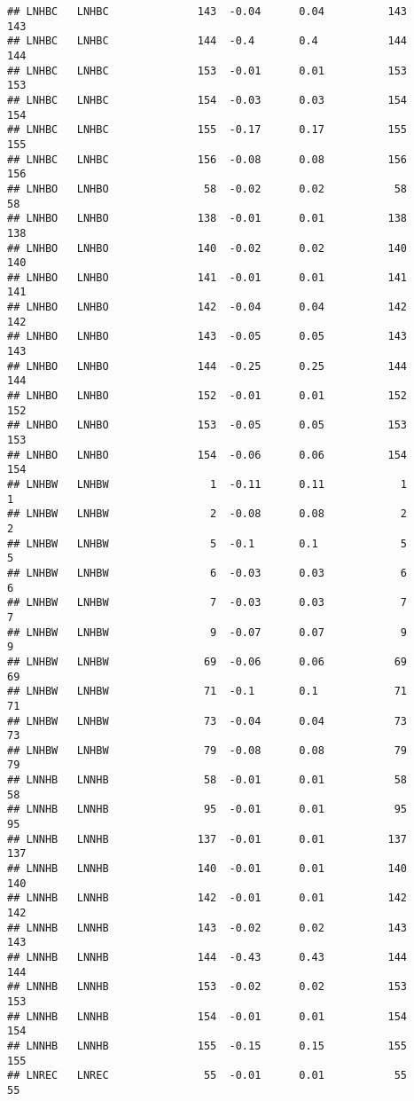 \documentclass[
]{article}
\begin{document}
\begin{verbatim}
## LNHBC   LNHBC              143  -0.04      0.04          143     143
## LNHBC   LNHBC              144  -0.4       0.4           144     144
## LNHBC   LNHBC              153  -0.01      0.01          153     153
## LNHBC   LNHBC              154  -0.03      0.03          154     154
## LNHBC   LNHBC              155  -0.17      0.17          155     155
## LNHBC   LNHBC              156  -0.08      0.08          156     156
## LNHBO   LNHBO               58  -0.02      0.02           58      58
## LNHBO   LNHBO              138  -0.01      0.01          138     138
## LNHBO   LNHBO              140  -0.02      0.02          140     140
## LNHBO   LNHBO              141  -0.01      0.01          141     141
## LNHBO   LNHBO              142  -0.04      0.04          142     142
## LNHBO   LNHBO              143  -0.05      0.05          143     143
## LNHBO   LNHBO              144  -0.25      0.25          144     144
## LNHBO   LNHBO              152  -0.01      0.01          152     152
## LNHBO   LNHBO              153  -0.05      0.05          153     153
## LNHBO   LNHBO              154  -0.06      0.06          154     154
## LNHBW   LNHBW                1  -0.11      0.11            1       1
## LNHBW   LNHBW                2  -0.08      0.08            2       2
## LNHBW   LNHBW                5  -0.1       0.1             5       5
## LNHBW   LNHBW                6  -0.03      0.03            6       6
## LNHBW   LNHBW                7  -0.03      0.03            7       7
## LNHBW   LNHBW                9  -0.07      0.07            9       9
## LNHBW   LNHBW               69  -0.06      0.06           69      69
## LNHBW   LNHBW               71  -0.1       0.1            71      71
## LNHBW   LNHBW               73  -0.04      0.04           73      73
## LNHBW   LNHBW               79  -0.08      0.08           79      79
## LNNHB   LNNHB               58  -0.01      0.01           58      58
## LNNHB   LNNHB               95  -0.01      0.01           95      95
## LNNHB   LNNHB              137  -0.01      0.01          137     137
## LNNHB   LNNHB              140  -0.01      0.01          140     140
## LNNHB   LNNHB              142  -0.01      0.01          142     142
## LNNHB   LNNHB              143  -0.02      0.02          143     143
## LNNHB   LNNHB              144  -0.43      0.43          144     144
## LNNHB   LNNHB              153  -0.02      0.02          153     153
## LNNHB   LNNHB              154  -0.01      0.01          154     154
## LNNHB   LNNHB              155  -0.15      0.15          155     155
## LNREC   LNREC               55  -0.01      0.01           55      55

\end{verbatim}
\end{document}
